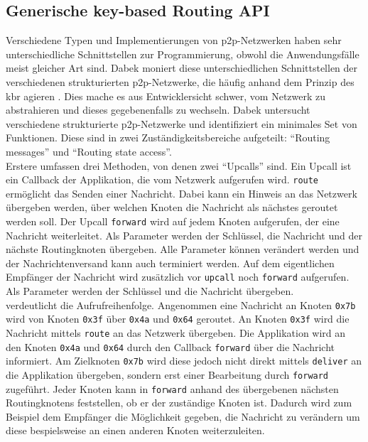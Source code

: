 \subsection{Generische key-based Routing API}
\label{chap:grundlagen:api}
Verschiedene Typen und Implementierungen von p2p-Netzwerken haben sehr unterschiedliche Schnittstellen zur Programmierung, obwohl die Anwendungsfälle meist gleicher Art sind. Dabek moniert diese unterschiedlichen Schnittstellen der verschiedenen strukturierten p2p-Netzwerke, die häufig anhand dem Prinzip des \ac{kbr} agieren \cite{Dabek2003Towards}. Dies mache es aus Entwicklersicht schwer, vom Netzwerk zu abstrahieren und dieses gegebenenfalls zu wechseln. Dabek untersucht verschiedene strukturierte p2p-Netzwerke und identifiziert ein minimales Set von Funktionen. Diese sind in zwei Zuständigkeitsbereiche aufgeteilt: \enquote{Routing messages} und \enquote{Routing state access}.\\
Erstere umfassen drei Methoden, von denen zwei \enquote{Upcalls} sind. Ein Upcall ist ein Callback der Applikation, die vom Netzwerk aufgerufen wird. \texttt{route} ermöglicht das Senden einer Nachricht. Dabei kann ein Hinweis an das Netzwerk übergeben werden, über welchen Knoten die Nachricht als nächstes geroutet werden soll. Der Upcall \texttt{forward} wird auf jedem Knoten aufgerufen, der eine Nachricht weiterleitet. Als Parameter werden der Schlüssel, die Nachricht und der nächste Routingknoten übergeben. Alle Parameter können verändert werden und der Nachrichtenversand kann auch terminiert werden. Auf dem eigentlichen Empfänger der Nachricht wird zusätzlich vor \texttt{upcall} noch \texttt{forward} aufgerufen. Als Parameter werden der Schlüssel und die Nachricht übergeben.\\
 verdeutlicht die Aufrufreihenfolge. Angenommen eine Nachricht an Knoten \texttt{0x7b} wird von Knoten \texttt{0x3f} über \texttt{0x4a} und \texttt{0x64} geroutet. An Knoten \texttt{0x3f} wird die Nachricht mittels \texttt{route} an das Netzwerk übergeben. Die Applikation wird an den Knoten \texttt{0x4a} und \texttt{0x64} durch den Callback \texttt{forward} über die Nachricht informiert. Am Zielknoten \texttt{0x7b} wird diese jedoch nicht direkt mittels \texttt{deliver} an die Applikation übergeben, sondern erst einer Bearbeitung durch \texttt{forward} zugeführt. Jeder Knoten kann in \texttt{forward} anhand des übergebenen nächsten Routingknotens feststellen, ob er der zuständige Knoten ist. Dadurch wird zum Beispiel dem Empfänger die Möglichkeit gegeben, die Nachricht zu verändern um diese bespielsweise an einen anderen Knoten weiterzuleiten.

